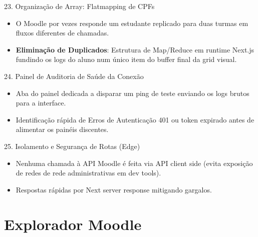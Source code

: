 \documentclass[10pt, aspectratio=169]{beamer}
\begin{document}
\begin{frame}{23. Organização de Array: Flatmapping de CPFs}
    \begin{itemize}
        \item O Moodle por vezes responde um estudante replicado para duas turmas em fluxos diferentes de chamadas.
        \item \textbf{Eliminação de Duplicados}: Estrutura de Map/Reduce em runtime Next.js fundindo os logs do aluno num único item do buffer final da grid visual.
    \end{itemize}
\end{frame}

\begin{frame}{24. Painel de Auditoria de Saúde da Conexão}
    \begin{itemize}
        \item Aba do painel dedicada a disparar um ping de teste enviando os logs brutos para a interface.
        \item Identificação rápida de Erros de Autenticação 401 ou token expirado antes de alimentar os painéis discentes.
    \end{itemize}
\end{frame}

\begin{frame}{25. Isolamento e Segurança de Rotas (Edge)}
    \begin{itemize}
        \item Nenhuma chamada à API Moodle é feita via API client side (evita exposição de redes de rede administrativas em dev tools).
        \item Respostas rápidas por Next server response mitigando gargalos.
    \end{itemize}
\end{frame}

\section{Explorador Moodle}
\end{document}
